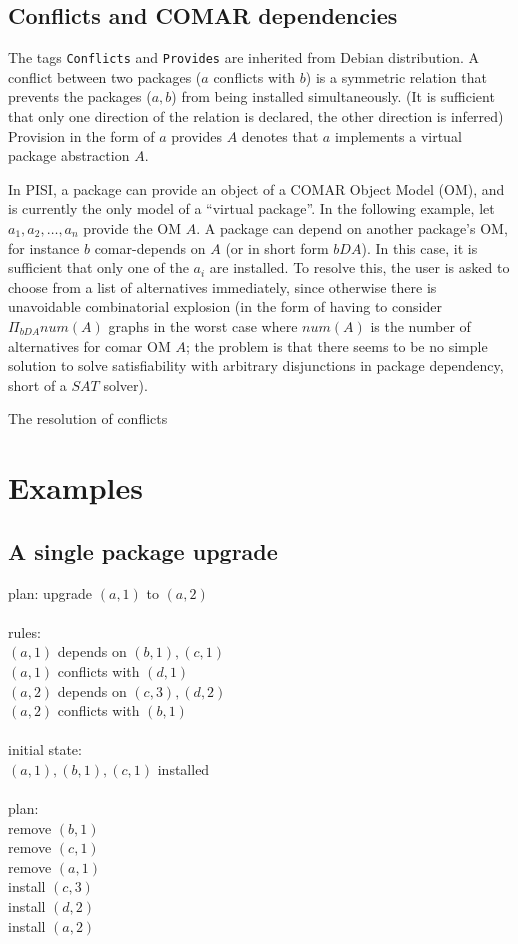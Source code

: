 \documentclass[a4paper,11pt]{article}
\begin{document}
\subsection{Conflicts and COMAR dependencies}

The tags \texttt{Conflicts} and \texttt{Provides} are inherited from
Debian distribution. A conflict between two packages ($a$ conflicts
with $b$) is a symmetric relation that prevents the packages ($a,b$)
from being installed simultaneously. (It is sufficient that only one
direction of the relation is declared, the other direction is
inferred) Provision in the form of $a$ provides $A$ denotes that $a$
implements a virtual package abstraction $A$.

In PISI, a package can provide an object of a COMAR Object Model (OM),
and is currently the only model of a ``virtual package''. In the
following example, let $a_1,a_2,\ldots,a_n$ provide the OM $A$. A package
can depend on another package's OM, for instance $b$ comar-depends on
$A$ (or in short form $bDA$). In this case, it is sufficient that only
one of the $a_i$ are installed. To resolve this, the user is asked to
choose from a list of alternatives immediately, since otherwise there
is unavoidable combinatorial explosion (in the form of having to
consider $\Pi_{bDA}num(A)$ graphs in the worst case where $num(A)$ is
the number of alternatives for comar OM $A$; the problem is that there
seems to be no simple solution to solve satisfiability with arbitrary
disjunctions in package dependency, short of a $SAT$ solver).

The resolution of conflicts 

\section{Examples}

\subsection{A single package upgrade}

plan: upgrade $(a,1)$ to $(a,2)$\\
\\
rules:\\
  $(a,1)$ depends on $(b,1), (c,1)$ \\
  $(a,1)$ conflicts with $(d,1)$\\
  $(a,2)$ depends on $(c,3), (d,2)$\\
  $(a,2)$ conflicts with $(b,1)$\\
\\
initial state:\\
  $(a,1), (b,1), (c,1)$ installed \\
\\
plan:\\
  remove $(b,1)$\\
  remove $(c,1)$\\
  remove $(a,1)$\\
  install $(c,3)$\\
  install $(d,2)$\\
  install $(a,2)$\\
\end{document}
